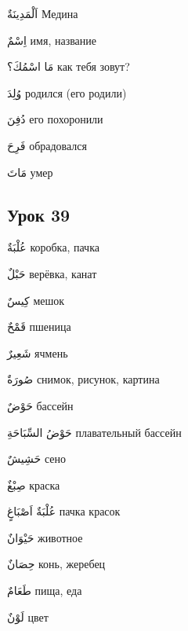 \documentclass[a5paper]{article}
\newcommand\textstyleDropCaps[1]{#1}
\newcommand\textstyleCaptioncharacters[1]{#1}
\begin{document}
\textstyleCaptioncharacters{اَلْمَدِينَةٌ }\textstyleDropCaps{Медина‎}

\textstyleCaptioncharacters{اِسْمٌ }\textstyleDropCaps{имя, название‎}

\textstyleCaptioncharacters{مَا اسْمُكَ؟ }\textstyleDropCaps{как тебя зо­вут?‎}

\textstyleCaptioncharacters{وُلِدَ }\textstyleDropCaps{родился (его родили)‎}

\textstyleCaptioncharacters{دُفِنَ }\textstyleDropCaps{его похоронили‎}

\textstyleCaptioncharacters{فَرِحَ }\textstyleDropCaps{обрадовался‎}

\textstyleCaptioncharacters{مَاتَ }\textstyleDropCaps{умер‎}

\subsection[Урок 39‎]{\textstyleDropCaps{Урок 39‎}}
\textstyleCaptioncharacters{عُلْبَةٌ }\textstyleDropCaps{коробка, пачка‎}

\textstyleCaptioncharacters{حَبْلٌ }\textstyleDropCaps{верёвка, канат‎}

\textstyleCaptioncharacters{كِيسٌ }\textstyleDropCaps{мешок‎}

\textstyleCaptioncharacters{قَمْحٌ }\textstyleDropCaps{пшеница‎}

\textstyleCaptioncharacters{شَعِيرٌ }\textstyleDropCaps{ячмень‎}

\textstyleCaptioncharacters{صُورَةٌ }\textstyleDropCaps{снимок, рисунок, картина‎}

\textstyleCaptioncharacters{حَوْضٌ }\textstyleDropCaps{бассейн‎}

\textstyleCaptioncharacters{حَوْضُ السِّبَاحَةِ }\textstyleDropCaps{плава­тельный бассейн‎}

\textstyleCaptioncharacters{حَشِيشٌ }\textstyleDropCaps{сено‎}

\textstyleCaptioncharacters{صِبْغٌ }\textstyleDropCaps{краска‎}

\textstyleCaptioncharacters{عُلْبَةٌ اَصْبَاغٍ }\textstyleDropCaps{пачка кра­сок‎}

\textstyleCaptioncharacters{حَيْوَانٌ }\textstyleDropCaps{животное‎}

\textstyleCaptioncharacters{حِصَانٌ }\textstyleDropCaps{конь, жеребец‎}

\textstyleCaptioncharacters{طَعَامٌ }\textstyleDropCaps{пища, еда‎}

\textstyleCaptioncharacters{لَوْنٌ }\textstyleDropCaps{цвет‎}
\end{document}
